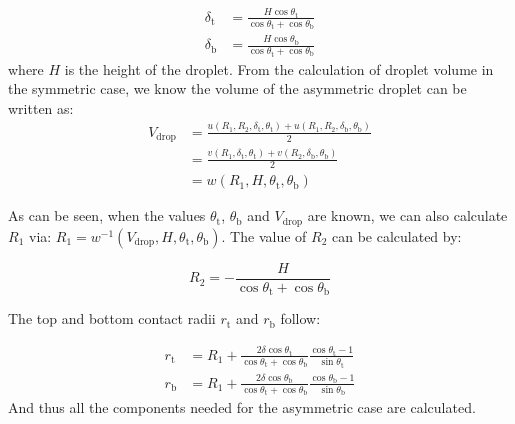 \begin{eqnarray}
\label{eq:small-deltas-1}
\delta_{\mathrm{t}} &= {\displaystyle \frac{H \cos \theta_{\mathrm{t}}}{\cos \theta_{\mathrm{t}} 
                  + \cos \theta_{\mathrm{b}}}} \\
\label{eq:small-deltas-2}
\delta_{\mathrm{b}} &= {\displaystyle \frac{H \cos \theta_{\mathrm{b}}}{\cos \theta_{\mathrm{t}} 
                  + \cos \theta_{\mathrm{b}}}}
\end{eqnarray}
where \(H\) is the height of the droplet.
From the calculation of droplet volume in the symmetric case, we know
the volume of the asymmetric droplet can be written as:
\begin{equation}
\label{eq:small-V-assym-1}
\begin{aligned}
V_{\mathrm{drop}} &= \frac{u(R_{1}, R_{2}, \delta_{\mathrm{t}}, \theta_{\mathrm{t}}) + u(R_{1}, R_{2}, \delta_{\mathrm{b}}, \theta_{\mathrm{b}})}{2}\\
                  &= \frac{v(R_{1}, \delta_{\mathrm{t}}, \theta_{\mathrm{t}}) +
                           v(R_{2}, \delta_{\mathrm{b}}, \theta_{\mathrm{b}})}{2} \\
                  &= w(R_{1}, H, \theta_{\mathrm{t}}, \theta_{\mathrm{b}})
\end{aligned}
\end{equation}

As can be seen, when the values \(\theta_{\mathrm{t}}\),
\(\theta_{\mathrm{b}}\) and \(V_{\mathrm{drop}}\) are known, we can also
calculate \(R_{1}\) via: \(R_{1} = w^{-1}(V_{\mathrm{drop}}, H,
 \theta_{\mathrm{t}}, \theta_{\mathrm{b}})\). The value of \(R_{2}\) can
be calculated by:

\begin{equation}
\label{eq:small-asym-R2}
R_{2} = -{\displaystyle \frac{H}{\cos \theta_{\mathrm{t}} + \cos \theta_{\mathrm{b}}}}
\end{equation}

The top and bottom
contact radii \(r_{\mathrm{t}}\) and \(r_{\mathrm{b}}\) follow:

\begin{eqnarray}
\label{eq:small-t-1}
r_{\mathrm{t}} &= R_{1} + {\displaystyle \frac{2\delta \cos \theta_{\mathrm{t}}}{\cos \theta_{\mathrm{t}} 
                                + \cos \theta_{\mathrm{b}}}
                          \frac{\cos \theta_{\mathrm{t}} - 1}{\sin \theta_{\mathrm{t}}}}\\
\label{eq:small-t-2}
r_{\mathrm{b}} &= R_{1} + {\displaystyle \frac{2\delta \cos \theta_{\mathrm{b}}}{\cos \theta_{\mathrm{t}} 
                                + \cos \theta_{\mathrm{b}}}
                          \frac{\cos \theta_{\mathrm{b}} - 1}{\sin \theta_{\mathrm{b}}}}
\end{eqnarray}
And thus all the components needed for the asymmetric case are calculated.

